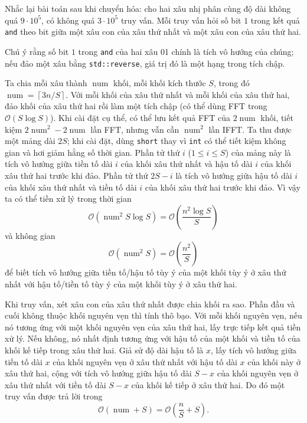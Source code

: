 \documentclass[11pt]{article}
\newcommand{\Oh}{\mathcal{O}}
\begin{document}
Nhắc lại bài toán sau khi chuyển hóa: cho hai xâu nhị phân cùng độ dài không
quá \(9\cdot 10^5\), có không quá \(3\cdot 10^5\) truy vấn. Mỗi truy vấn hỏi
số bit \(1\) trong kết quả \texttt{and} theo bit giữa một xâu con của xâu thứ
nhất và một xâu con của xâu thứ hai.

Chú ý rằng số bit \(1\) trong \texttt{and} của hai xâu 01 chính là tích vô
hướng của chúng; nếu đảo một xâu bằng \texttt{std::reverse}, giá trị đó là
một hạng trong tích chập.

Ta chia mỗi xâu thành \(\operatorname{num}\) khối, mỗi khối kích thước \(S\),
trong đó \(\operatorname{num}=\left\lceil 3n/S\right\rceil\). Với mỗi khối của
xâu thứ nhất và mỗi khối của xâu thứ hai, đảo khối của xâu thứ hai rồi làm
một tích chập (có thể dùng FFT trong \(\Oh(S\log S)\)). Khi cài đặt cụ thể,
có thể lưu kết quả FFT của \(2\operatorname{num}\) khối, tiết kiệm
\(2\operatorname{num}^2-2\operatorname{num}\) lần FFT, nhưng vẫn cần
\(\operatorname{num}^2\) lần IFFT. Ta thu được một mảng dài \(2S\); khi cài
đặt, dùng \texttt{short} thay vì \texttt{int} có thể tiết kiệm không gian và
hơi giảm hằng số thời gian. Phần tử thứ \(i\) (\(1\le i\le S\)) của mảng này
là tích vô hướng giữa tiền tố dài \(i\) của khối xâu thứ nhất và hậu tố dài
\(i\) của khối xâu thứ hai trước khi đảo. Phần tử thứ \(2S-i\) là tích vô
hướng giữa hậu tố dài \(i\) của khối xâu thứ nhất và tiền tố dài \(i\) của
khối xâu thứ hai trước khi đảo. Vì vậy ta có thể tiền xử lý trong thời gian
\[
  \Oh(\operatorname{num}^2S\log S)=\Oh\left(\frac{n^2\log S}{S}\right)
\]
và không gian
\[
  \Oh(\operatorname{num}^2S)=\Oh\left(\frac{n^2}{S}\right)
\]
để biết tích vô hướng giữa tiền tố/hậu tố tùy ý của một khối tùy ý ở xâu thứ
nhất với hậu tố/tiền tố tùy ý của một khối tùy ý ở xâu thứ hai.

Khi truy vấn, xét xâu con của xâu thứ nhất được chia khối ra sao. Phần đầu và
cuối không thuộc khối nguyên vẹn thì tính thô bạo. Với mỗi khối nguyên vẹn,
nếu nó tương ứng với một khối nguyên vẹn của xâu thứ hai, lấy trực tiếp kết
quả tiền xử lý. Nếu không, nó nhất định tương ứng với hậu tố của một khối và
tiền tố của khối kế tiếp trong xâu thứ hai. Giả sử độ dài hậu tố là \(x\), lấy
tích vô hướng giữa tiền tố dài \(x\) của khối nguyên vẹn ở xâu thứ nhất với
hậu tố dài \(x\) của khối này ở xâu thứ hai, cộng với tích vô hướng giữa hậu
tố dài \(S-x\) của khối nguyên vẹn ở xâu thứ nhất với tiền tố dài \(S-x\) của
khối kế tiếp ở xâu thứ hai. Do đó một truy vấn được trả lời trong
\[
  \Oh(\operatorname{num}+S)=\Oh\left(\frac nS+S\right).
\]
\end{document}
